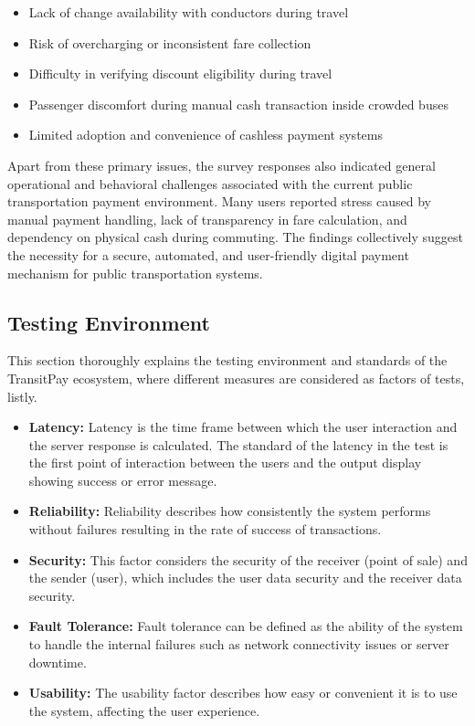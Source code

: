 \documentclass[sigconf, nonacm]{acmart}
\begin{document}
\begin{itemize}
    \item Lack of change availability with conductors during travel
    \item Risk of overcharging or inconsistent fare collection
    \item Difficulty in verifying discount eligibility during travel
    \item Passenger discomfort during manual cash transaction inside crowded buses
    \item Limited adoption and convenience of cashless payment systems
    \\
\end{itemize}
Apart from these primary issues, the survey responses also indicated general operational and behavioral challenges associated with the current public transportation payment environment. Many users reported stress caused by manual payment handling, lack of transparency in fare calculation, and dependency on physical cash during commuting. The findings collectively suggest the necessity for a secure, automated, and user-friendly digital payment mechanism for public transportation systems.

\subsection{Testing Environment}
This section thoroughly explains the testing environment and standards of the TransitPay ecosystem, where different measures are considered as factors of tests, listly.

\begin{itemize}
    \item \textbf{Latency:} Latency is the time frame between which the user interaction and the server response is calculated. The standard of the latency in the test is the first point of interaction between the users and the output display showing success or error message.
    \item \textbf{Reliability:} Reliability describes how consistently the system performs without failures resulting in the rate of success of transactions.
    \item \textbf{Security:} This factor considers the security of the receiver (point of sale) and the sender (user), which includes the user data security and the receiver data security.
     \item \textbf{Fault Tolerance:} Fault tolerance can be defined as the ability of the system to handle the internal failures such as network connectivity issues or server downtime.
     \item \textbf{Usability: } The usability factor describes how easy or convenient it is to use the system, affecting the user experience.
\end{itemize}
\end{document}
